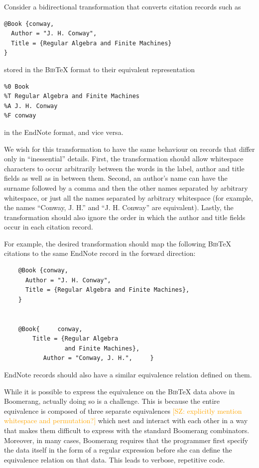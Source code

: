 \documentclass{svproc}
\newcommand{\FINISH}[3]{\ifdraft\textcolor{#1}{[#2: #3]}\fi}
\newcommand{\saz}[1]{\FINISH{orange}{SZ}{#1}}
\newcommand{\bibtex}{\textsc{Bib}\TeX{}}
\begin{document}
Consider a bidirectional transformation that converts citation records such as
\begin{verbatim}
@Book {conway,
  Author = "J. H. Conway",
  Title = {Regular Algebra and Finite Machines}
}
\end{verbatim}

\noindent stored in the \bibtex{} format to their equivalent representation 
\begin{verbatim}
%0 Book
%T Regular Algebra and Finite Machines
%A J. H. Conway
%F conway
\end{verbatim}

\noindent in the EndNote format, and vice versa. 

We wish for this transformation to have the same behaviour on records that
differ only in ``inessential'' details. First, the transformation
should allow whitespace characters to occur arbitrarily between the words in the
label, author and title fields as well as in between them. Second, an
author's name can have the surname followed by a comma and then the other
names separated by arbitrary whitespace, or just all the names separated by
arbitrary whitespace (for example, the names ``Conway, J. H.'' and ``J. H.
Conway'' are equivalent). Lastly, the transformation should also ignore the
order in which the author and title fields occur in each citation record.

For example, the desired transformation should map the following
\bibtex{} citations to the same EndNote record in the forward direction:
\begin{verbatim}
    @Book {conway,
      Author = "J. H. Conway",
      Title = {Regular Algebra and Finite Machines},
    }


    @Book{     conway,
        Title = {Regular Algebra 
                 and Finite Machines},
           Author = "Conway, J. H.",     }
\end{verbatim}
\noindent EndNote records should also have a similar equivalence relation
defined on them.

While it is possible to express the equivalence on the \bibtex{} data above in
Boomerang, actually doing so is a challenge. This is because the entire
equivalence is composed of three separate equivalences \saz{explicitly mention
  whitespace and permutation?} which nest and interact
with each other in a way that makes them difficult to express with the standard
Boomerang combinators. Moreover, in many cases, Boomerang requires that the
programmer first specify the data itself in the form of a regular expression
before she can define the equivalence relation on that data. This leads to
verbose, repetitive code.
\end{document}
